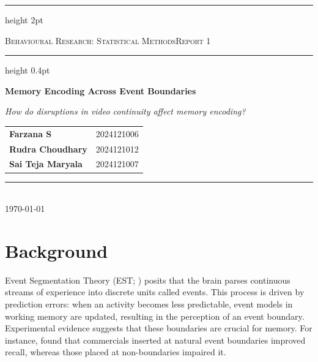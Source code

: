 \documentclass[11pt, a4paper]{article}
\begin{document}
\thispagestyle{empty}

\begin{titlepage}

{\color{accent}\hrule height 2pt}
\vspace{6pt}
{\footnotesize\color{textgrey}%
  \textsc{Behavioural Research: Statistical Methods}\hfill\textsc{Report 1}\par}
\vspace{6pt}
{\color{rulegrey}\hrule height 0.4pt}

\vspace{2.8cm}

{\fontsize{20}{26}\selectfont\bfseries\color{accent}
Memory Encoding Across Event Boundaries\par}

\vspace{0.5cm}
{\large\color{textgrey}\itshape
How do disruptions in video continuity affect memory encoding?\par}

\vspace{2.5cm}

{\normalsize
\begin{tabular}{@{}ll@{}}
  \textbf{Farzana S}        & \textcolor{textgrey}{2024121006} \\[5pt]
  \textbf{Rudra Choudhary}  & \textcolor{textgrey}{2024121012} \\[5pt]
  \textbf{Sai Teja Maryala} & \textcolor{textgrey}{2024121007} \\
\end{tabular}\par}

\vfill

{\color{rulegrey}\rule{\linewidth}{0.4pt}}\\[6pt]
{\small\color{textgrey}\today}

\end{titlepage}

\clearpage
\setcounter{page}{1}

\section{Background}

Event Segmentation Theory (EST; \citealt{zacks2007event}) posits that the brain parses continuous streams of experience into discrete units called events. This process is driven by prediction errors: when an activity becomes less predictable, event models in working memory are updated, resulting in the perception of an event boundary. Experimental evidence suggests that these boundaries are crucial for memory. For instance, \citet{boltz1992temporal} found that commercials inserted at natural event boundaries improved recall, whereas those placed at non-boundaries impaired it.
\end{document}
